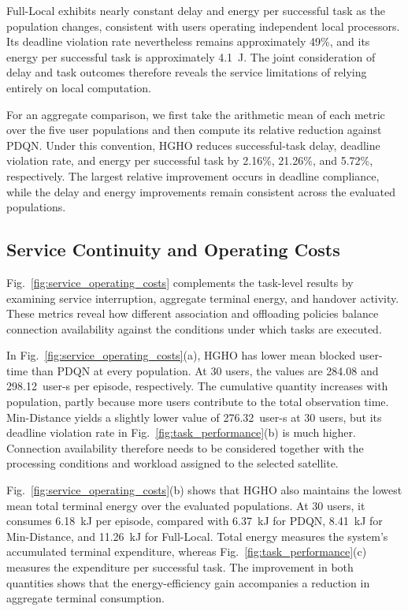 \documentclass[journal]{IEEEtran}
\begin{document}
Full-Local exhibits nearly constant delay and energy
per successful task as the population changes, consistent
with users operating independent local processors.
Its deadline violation rate nevertheless remains
approximately 49\%, and its energy per successful
task is approximately 4.1~J.
The joint consideration of delay and task outcomes
therefore reveals the service limitations of relying
entirely on local computation.

For an aggregate comparison, we first take the arithmetic
mean of each metric over the five user populations
and then compute its relative reduction against PDQN.
Under this convention, HGHO reduces successful-task
delay, deadline violation rate, and energy per successful
task by 2.16\%, 21.26\%, and 5.72\%, respectively.
The largest relative improvement occurs in deadline
compliance, while the delay and energy improvements
remain consistent across the evaluated populations.



\subsection{Service Continuity and Operating Costs}
\label{subsec:service_operating_costs}

Fig.~\ref{fig:service_operating_costs} complements the
task-level results by examining service interruption,
aggregate terminal energy, and handover activity.
These metrics reveal how different association and
offloading policies balance connection availability
against the conditions under which tasks are executed.

In Fig.~\ref{fig:service_operating_costs}(a), HGHO
has lower mean blocked user-time than PDQN at every
population. At 30 users, the values are 284.08 and
298.12~user-s per episode, respectively.
The cumulative quantity increases with population,
partly because more users contribute to the total
observation time.
Min-Distance yields a slightly lower value of
276.32~user-s at 30 users, but its deadline violation
rate in Fig.~\ref{fig:task_performance}(b) is much higher.
Connection availability therefore needs to be considered
together with the processing conditions and workload
assigned to the selected satellite.

Fig.~\ref{fig:service_operating_costs}(b) shows that
HGHO also maintains the lowest mean total
terminal energy over the evaluated populations.
At 30 users, it consumes 6.18~kJ per episode,
compared with 6.37~kJ for PDQN,
8.41~kJ for Min-Distance, and 11.26~kJ for Full-Local.
Total energy measures the system's accumulated
terminal expenditure, whereas
Fig.~\ref{fig:task_performance}(c) measures the
expenditure per successful task.
The improvement in both quantities shows that the
energy-efficiency gain accompanies a reduction in
aggregate terminal consumption.
\end{document}
